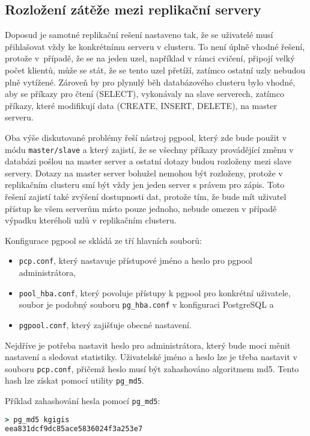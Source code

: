 \subsection{Rozložení zátěže mezi replikační servery}

Doposud je samotné replikační rešení nastaveno tak, že se uživatelé musí
přihlašovat vždy ke konkrétnímu serveru v clusteru. To není úplně vhodné řešení,
protože v~případě, že se na jeden uzel, například v rámci cvičení, připojí velký
počet klientů, může se stát, že se tento uzel přetíží, zatímco ostatní uzly
nebudou plně vytížené. Zároveň by pro plynulý běh databázového clusteru bylo
vhodné, aby se příkazy pro čtení (SELECT), vykonávaly na slave serverech,
zatímco příkazy, které modifikují data (CREATE, INSERT, DELETE), na master
serveru.

Oba výše diskutované problémy řeší nástroj pgpool, který zde bude
použit v módu \texttt{master/slave} a který zajistí, že se všechny příkazy
provádějící změnu v databázi pošlou na master server a ostatní dotazy budou
rozloženy mezi slave servery. Dotazy na master server bohužel nemohou být
rozloženy, protože v replikačním clusteru smí být vždy jen jeden server s právem
pro zápis. Toto řešení zajistí také zvýšení dostupnosti dat, protože tím, že
bude mít uživatel přístup ke všem serverům místo pouze jednoho, nebude omezen v
případě výpadku kteréholi uzlů v replikačním clusteru.

Konfigurace pgpool se skládá ze tří hlavních souborů:
\begin{itemize}
  \item \texttt{pcp.conf}, který nastavuje přístupové jméno a heslo pro
    pgpool administrátora,
  \item \texttt{pool\_hba.conf}, který povoluje přístupy k pgpool pro
    konkrétní uživatele, soubor je podobný souboru \texttt{pg\_hba.conf} v
    konfiguraci PostgreSQL a
  \item \texttt{pgpool.conf}, který zajišťuje obecné nastavení.
\end{itemize}

Nejdříve je potřeba nastavit heslo pro administrátora, který bude moci měnit
nastavení a sledovat statistiky. Uživatelské jméno a heslo lze je třeba nastavit
v souboru \texttt{pcp.conf}, přičemž heslo musí být zahashováno algoritmem md5.
Tento hash lze získat pomocí utility \texttt{pg\_md5}.

Příklad zahashování hesla  pomocí \texttt{pg\_md5}:
\begin{lstlisting}[language=ruby,morekeywords={pg_md5}]
> pg_md5 kgigis
eea831dcf9dc85ace5836024f3a253e7
\end{lstlisting}

